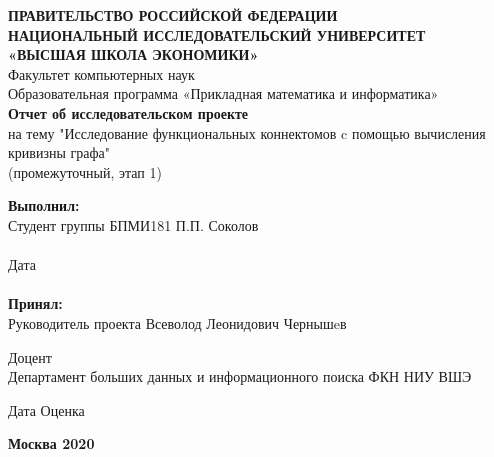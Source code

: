 \documentclass[a4paper]{article}
\begin{document}
\begin{center}
    \textbf{ПРАВИТЕЛЬСТВО РОССИЙСКОЙ ФЕДЕРАЦИИ} \\
    \textbf{НАЦИОНАЛЬНЫЙ ИССЛЕДОВАТЕЛЬСКИЙ УНИВЕРСИТЕТ} \\
    \textbf{«ВЫСШАЯ ШКОЛА ЭКОНОМИКИ»} \\
    \hfill\break
    \normalsize{Факультет компьютерных наук} \\
    Образовательная программа «Прикладная математика и информатика» \\
    \vspace{4.2cm}
    \textbf{Отчет об исследовательском проекте} \\
    \hfill\break
    на тему "Исследование функциональных коннектомов c помощью вычисления
    кривизны графа" \\
    \hfill\break
    (промежуточный, этап 1)
\end{center}
\vspace{3cm}
\textbf{Выполнил:} \\
Студент группы БПМИ181 \hfill \underline{\hspace{5cm}} \hfill П.П. Соколов \\
\vspace{0.1cm} \\
\hspace*{\fill} Дата \;\underline{\hspace{4cm}} \\
\vspace{0.1cm} \\
\textbf{Принял:} \\
Руководитель проекта \hfill Всеволод Леонидович Чернышeв
\begin{flushright}
    Доцент \\
    Департамент больших данных и информационного поиска ФКН НИУ ВШЭ
\end{flushright}
\vspace{0.5cm}
Дата \;\underline{\hspace{4cm}} \hfill
Оценка \quad \underline{\hspace{1.5cm}} \hfill
\underline{\hspace{5cm}} \\
\vfill
\begin{center}
    \textbf{Москва 2020}
\end{center}
\thispagestyle{empty}

\newpage

\tableofcontents

\newpage
\end{document}
